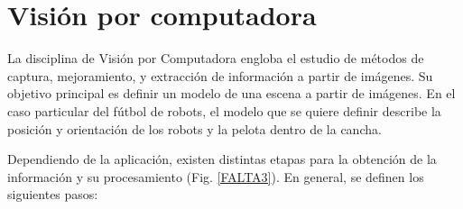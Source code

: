 
\section{Visión por computadora}

La disciplina de Visión por Computadora engloba el estudio de métodos de
captura, mejoramiento, y extracción de información a partir de imágenes. Su
objetivo principal es definir un modelo de una escena a partir de
imágenes\cite{cvLinda2001}. En el caso particular del fútbol de robots, el
modelo que se quiere definir describe la posición y orientación de los robots y
la pelota dentro de la cancha.

Dependiendo de la aplicación, existen distintas etapas para la obtención de la
información y su procesamiento (Fig. \ref{FALTA3}). En general, se definen los
siguientes pasos\cite{digitalImageProcessing2ed,wikiCV}:

